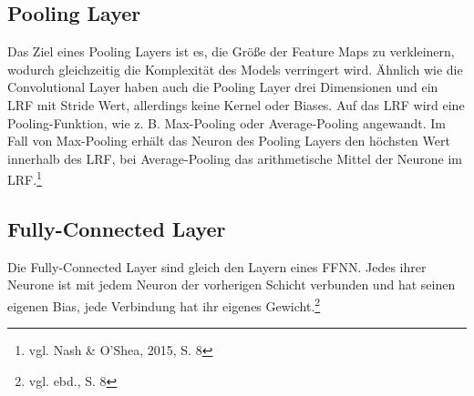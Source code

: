 \documentclass[
	a4paper,
	12pt,
	ngerman,
	oneside
]{scrreprt}											%
\newcommand{\cnnKlein}[1]{vgl. Nash \& O'Shea, 2015, S. {#1}}
\newcommand{\ebd}[1]{vgl. ebd., S. {#1}}
\begin{document}
				
				
			\subsection{Pooling Layer}
				Das Ziel eines Pooling Layers ist es, die Größe der Feature Maps zu verkleinern, wodurch gleichzeitig die Komplexität des Models verringert wird. Ähnlich wie die Convolutional Layer haben auch die Pooling Layer drei Dimensionen und ein LRF mit Stride Wert, allerdings keine Kernel oder Biases. Auf das LRF wird eine Pooling-Funktion, wie z. B. Max-Pooling oder Average-Pooling angewandt. Im Fall von Max-Pooling erhält das Neuron des Pooling Layers den höchsten Wert innerhalb des LRF, bei Average-Pooling das arithmetische Mittel der Neurone im LRF.\footnote{\cnnKlein{8}}
				
			\subsection{Fully-Connected Layer}
				Die Fully-Connected Layer sind gleich den Layern eines FFNN. Jedes ihrer Neurone ist mit jedem Neuron der vorherigen Schicht verbunden und hat seinen eigenen Bias, jede Verbindung hat ihr eigenes Gewicht.\footnote{\ebd{8}}
				
\end{document}
